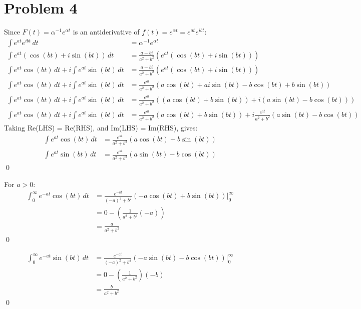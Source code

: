 \documentclass[a4paper, titlepage, DIV=14]{scrartcl}
\begin{document}
    \section*{Problem 4}
    Since $F(t) = \alpha^{-1}e^{\alpha t}$ is an antiderivative of $f(t) = e^{\alpha t} = e^{at}e^{ibt}$:
    \begin{align*}
        \int e^{at}e^{ibt} \, dt  &= \alpha^{-1}e^{\alpha t}  \\
        \int e^{at}(\cos(bt) + i\sin(bt)) \, dt  &= \frac{a-bi}{a^{2}+b^{2}}(e^{at}(\cos(bt) + i\sin(bt))) \\
        \int e^{at}\cos(bt) \, dt + i\int e^{at} \sin(bt) \, dt  &= \frac{a-bi}{a^{2}+b^{2}}(e^{at}(\cos(bt) + i\sin(bt))) \\
        \int e^{at}\cos(bt) \, dt + i\int e^{at} \sin(bt) \, dt  &= \frac{e^{at}}{a^{2}+b^{2}}(a\cos(bt) + ai\sin(bt) - b\cos(bt) + b\sin(bt)) \\
        \int e^{at}\cos(bt) \, dt + i\int e^{at} \sin(bt) \, dt  &= \frac{e^{at}}{a^{2}+b^{2}}((a\cos(bt) + b\sin(bt)) + i(a\sin(bt) - b\cos(bt))) \\
        \int e^{at}\cos(bt) \, dt + i\int e^{at} \sin(bt) \, dt  &= \frac{e^{at}}{a^{2}+b^{2}}(a\cos(bt) + b\sin(bt)) + i\frac{e^{at}}{a^{2}+b^{2}}(a\sin(bt) - b\cos(bt)) 
    \end{align*}
    Taking Re(LHS) = Re(RHS), and Im(LHS) = Im(RHS), gives:
    \begin{align*}
        \int e^{at}\cos(bt) \, dt &= \frac{e^{at}}{a^{2}+b^{2}}(a\cos(bt) + b\sin(bt)) \\
        \int e^{at}\sin(bt) \, dt &= \frac{e^{at}}{a^{2}+b^{2}}(a\sin(bt) - b\cos(bt))
    \end{align*} \qed

    For $a>0$:
    \begin{align*}
        \int_{0}^{\infty} e^{-at}\cos(bt) \, dt &= \frac{e^{-at}}{(-a)^{2}+b^{2}}(-a\cos(bt) + b\sin(bt)) \Big|^{\infty}_{0} \\
            &= 0 - (\frac{1}{a^{2}+b^{2}}(-a)) \\
            &= \frac{a}{a^{2}+b^{2}} 
    \end{align*} \qed

    \begin{align*}
        \int_{0}^{\infty} e^{-at}\sin(bt) \, dt &= \frac{e^{-at}}{(-a)^{2}+b^{2}}(-a\sin(bt) - b\cos(bt)) \Big|^{\infty}_{0} \\
            &= 0 - (\frac{1}{a^{2}+b^{2}})(-b) \\
            &= \frac{b}{a^{2}+b^{2}} 
    \end{align*} \qed
\end{document}
